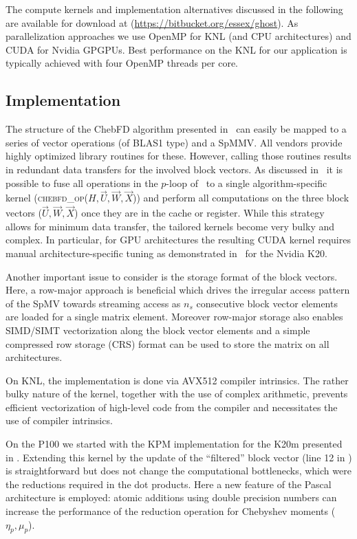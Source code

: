 \documentclass[letterpaper]{llncs}
\begin{document}
The compute kernels and implementation alternatives discussed in the
following are available for download at (\url{https://bitbucket.org/essex/ghost}).
As parallelization
approaches we use OpenMP for KNL (and CPU architectures) and CUDA for
Nvidia GPGPUs. Best performance on the KNL for our application is
typically achieved with four OpenMP threads per core.

\subsection{Implementation}

The structure of the ChebFD algorithm presented
in~ can easily be mapped to a series of
vector operations (of BLAS1 type) and a SpMMV. All vendors provide
highly optimized library routines for these.
However, calling those routines results in redundant data
transfers for the involved block vectors.
As discussed in~\cite{Kreutzer15KPM,Pieper15ChebFD} it is possible to fuse all
operations in the $p$-loop of~ to a single
algorithm-specific kernel (\textsc{chebfd\_op($H,\vec U, \vec W,\vec
  X$)}) and perform all computations on the three block vectors
(\textsc{$\vec U,\vec W,\vec X$}) once they are in the cache or
register. While this strategy allows for minimum data transfer,
the tailored kernels become very bulky and complex. In particular, for
GPU architectures the resulting CUDA kernel requires manual
architecture-specific tuning as demonstrated in~\cite{Kreutzer15KPM} for
the Nvidia K20.

Another important issue to consider is the storage format of the block
vectors. Here, a row-major approach is beneficial which drives the
irregular access pattern of the SpMV towards streaming access as $n_s$
consecutive block vector elements are loaded for a single matrix
element. Moreover row-major storage also enables SIMD/SIMT
vectorization along the block vector elements and a simple compressed
row storage (CRS) format can be used to store the matrix on all
architectures.

On KNL, the implementation is done via AVX512 compiler intrinsics. The rather
bulky nature of the kernel, together with the use of complex arithmetic,
prevents efficient vectorization of high-level code from the compiler and
necessitates the use of compiler intrinsics.

On the P100 we started with the KPM implementation for the K20m
presented in \cite{Kreutzer15KPM}. Extending this kernel by the update
of the ``filtered'' block vector (line 12 in
) is straightforward but does not change the
computational bottlenecks, which were the reductions required in the
dot products. Here a new feature of the Pascal architecture is
employed: atomic additions using double precision numbers can
increase the performance of the reduction operation for Chebyshev
moments ($\eta_p, \mu_p$).
\end{document}
